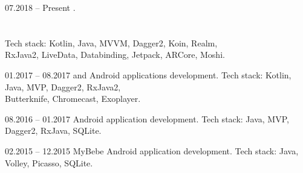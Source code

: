 \documentclass[12pt, a4paper]{article}
\begin{document}
\begin{minipage}[t]{0.6\textwidth}
    
    \vspace{24pt}
    
    \begin{subsec}{}{07.2018 – Present}
        \>  .   \lineend
        \>          \\
        \>        \\
        \>             \\
        \>                \lineend
        \>  Tech stack: Kotlin, Java, MVVM,  Dagger2, Koin, Realm,   \\
        \>  RxJava2, LiveData, Databinding, Jetpack, ARCore, Moshi.  \\
    \end{subsec}
    
    \vspace{24pt}
    
    \begin{subsec}{}{01.2017 – 08.2017}
        \>   and  Android applications development.   \lineend
        \>  Tech stack: Kotlin, Java, MVP, Dagger2, RxJava2,                                        \\
        \>  Butterknife, Chromecast, Exoplayer.                                                     \\
    \end{subsec}
    
    \vspace{24pt}
    
    \begin{subsec}{}{08.2016 – 01.2017}
        \>   Android application development.    \lineend
        \>                             \lineend
        \>  Tech stack: Java, MVP, Dagger2, RxJava, SQLite.             \\
    \end{subsec}

    \vspace{24pt}
    
    \begin{subsec}{}{02.2015 – 12.2015}
        \> MyBebe Android application development. \lineend
        \> Tech stack: Java, Volley, Picasso, SQLite. \\
    \end{subsec}
    

\end{minipage}
\end{document}
